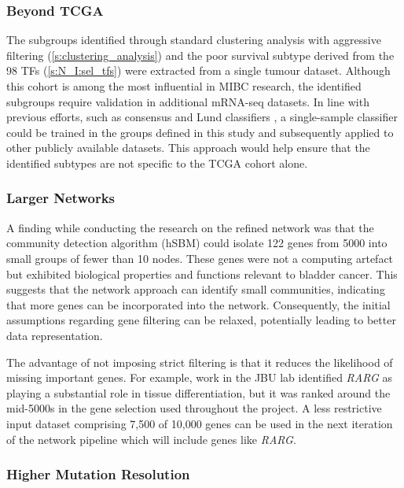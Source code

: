 \subsubsection*{Beyond TCGA}

The subgroups identified through standard clustering analysis with aggressive filtering (\cref{s:clustering_analysis}) and the poor survival subtype derived from the 98 TFs (\cref{s:N_I:sel_tfs}) were extracted from a single tumour dataset. Although this cohort is among the most influential in MIBC research, the identified subgroups require validation in additional mRNA-seq datasets. In line with previous efforts, such as consensus and Lund classifiers \citep{Marzouka2018-ge,Kamoun2020-tj}, a single-sample classifier could be trained in the groups defined in this study and subsequently applied to other publicly available datasets. This approach would help ensure that the identified subtypes are not specific to the TCGA cohort alone.

\subsubsection*{Larger Networks}

A finding while conducting the research on the refined network was that the community detection algorithm (hSBM) could isolate 122 genes from 5000 into small groups of fewer than 10 nodes. These genes were not a computing artefact but exhibited biological properties and functions relevant to bladder cancer. This suggests that the network approach can identify small communities, indicating that more genes can be incorporated into the network. Consequently, the initial assumptions regarding gene filtering can be relaxed, potentially leading to better data representation.

The advantage of not imposing strict filtering is that it reduces the likelihood of missing important genes. For example, work in the JBU lab identified \textit{RARG} as playing a substantial role in tissue differentiation, but it was ranked around the mid-5000s in the gene selection used throughout the project. A less restrictive input dataset comprising 7,500 of 10,000 genes can be used in the next iteration of the network pipeline which will include genes like \textit{RARG}.

\subsubsection*{Higher Mutation Resolution}

